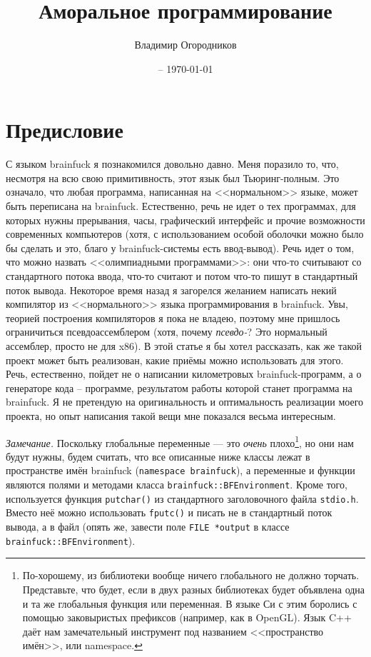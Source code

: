 \documentclass{book}
\title{Аморальное программирование}
\author{Владимир Огородников}
\date{\formatdate{20}{9}{2016} -- \today}
\begin{document}
\maketitle
\tableofcontents


\section*{Предисловие}

С языком brainfuck я познакомился довольно давно. Меня поразило то, что, несмотря на
всю свою примитивность, этот язык был Тьюринг-полным. Это означало, что любая программа,
написанная на <<нормальном>> языке, может быть переписана на brainfuck. Естественно,
речь не идет о тех программах, для которых нужны прерывания, часы, графический
интерфейс и прочие возможности современных компьютеров (хотя, с использованием особой
оболочки можно было бы сделать и это, благо у brainfuck-системы есть ввод-вывод). Речь
идет о том, что можно назвать <<олимпиадными программами>>: они что-то считывают со
стандартного потока ввода, что-то считают и потом что-то пишут в стандартный поток
вывода. Некоторое время назад я загорелся желанием написать некий компилятор из
<<нормального>> языка программирования в brainfuck. Увы, теорией построения компиляторов
я пока не владею, поэтому мне пришлось ограничиться псевдоассемблером (хотя, почему
\textit{псевдо-}? Это нормальный ассемблер, просто не для x86). В этой статье я бы хотел
рассказать, как же такой проект может быть реализован, какие приёмы можно использовать
для этого. Речь, естественно, пойдет не о написании километровых brainfuck-программ, а о
генераторе кода -- программе, результатом работы которой станет программа на brainfuck.
Я не претендую на оригинальность и оптимальность реализации моего проекта,
но опыт написания такой вещи мне показался весьма интересным. 

{\em Замечание.} Поскольку глобальные переменные --- это {\em очень} плохо\footnote{По-хорошему,
из библиотеки вообще ничего глобального не должно торчать. Представьте, что будет, если в двух
разных библиотеках будет объявлена одна и та же глобальныя функция или переменная. В языке Си
с этим боролись с помощью заковыристых префиксов (например, как в OpenGL). Язык C++ даёт нам
замечательный инструмент под названием <<пространство имён>>, или namespace.}, но они нам будут
нужны, будем считать, что все описанные ниже классы лежат в пространстве имён brainfuck 
(\texttt{namespace brainfuck}), а переменные и функции являются полями и методами класса
\texttt{brainfuck::BFEnvironment}. Кроме того, используется функция \texttt{putchar()} из
стандартного заголовочного файла \texttt{stdio.h}. Вместо неё можно использовать \texttt{fputc()}
и писать не в стандартный поток вывода, а в файл (опять же, завести поле \texttt{FILE~*output}
в классе \texttt{brainfuck::BFEnvironment}).
\end{document}
